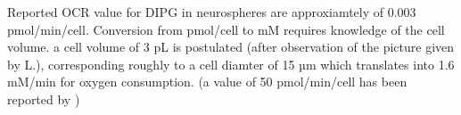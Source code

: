 \documentclass[11pt,a4paper]{article}
\begin{document}
Reported OCR value for DIPG in neurospheres are approxiamtely of 0.003 pmol/min/cell.\cite{Shen2019}\cite{Ruas2018} Conversion from pmol/cell to mM requires knowledge of the cell volume. a cell volume of 3 pL is postulated (after observation of the picture given by L.), corresponding roughly to a cell diamter of 15 µm which translates into 1.6 mM/min for oxygen consumption. (a value of 50 pmol/min/cell has been reported by \cite{Mbah2022})

\end{document}
